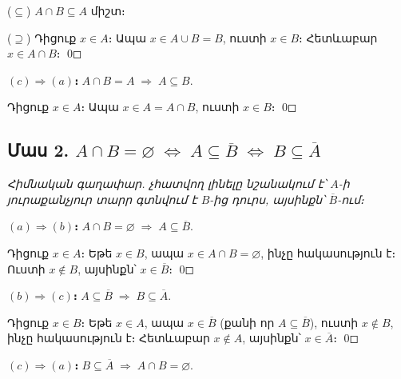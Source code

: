 \documentclass[12pt, a4paper]{article}
\newcommand{\comp}[1]{\overline{#1}}
\begin{document}
($\subseteq$)\; $A \cap B \subseteq A$ միշտ։

($\supseteq$)\; Դիցուք $x \in A$։
Ապա $x \in A \cup B = B$, ուստի $x \in B$։
Հետևաբար $x \in A \cap B$։ \qed

\textbf{$(c) \Rightarrow (a)$։}\;
$A \cap B = A \;\Longrightarrow\; A \subseteq B$.

Դիցուք $x \in A$։ Ապա $x \in A = A \cap B$, ուստի $x \in B$։ \qed

\subsection*{Մաս 2.\; $A \cap B = \varnothing \;\iff\; A \subseteq \comp{B} \;\iff\; B \subseteq \comp{A}$}

\begin{center}
\end{center}

\smallskip
\textit{Հիմնական գաղափար. չհատվող լինելը նշանակում է՝ $A$-ի յուրաքանչյուր տարր գտնվում է $B$-ից դուրս, այսինքն՝ $\comp{B}$-ում։}

\smallskip
\textbf{$(a) \Rightarrow (b)$։}\;
$A \cap B = \varnothing \;\Longrightarrow\; A \subseteq \comp{B}$.

Դիցուք $x \in A$։ Եթե $x \in B$, ապա $x \in A \cap B = \varnothing$, ինչը հակասություն է։
Ուստի $x \notin B$, այսինքն՝ $x \in \comp{B}$։ \qed

\textbf{$(b) \Rightarrow (c)$։}\;
$A \subseteq \comp{B} \;\Longrightarrow\; B \subseteq \comp{A}$.

Դիցուք $x \in B$։ Եթե $x \in A$, ապա $x \in \comp{B}$ (քանի որ $A \subseteq \comp{B}$),
ուստի $x \notin B$, ինչը հակասություն է։ Հետևաբար $x \notin A$, այսինքն՝ $x \in \comp{A}$։ \qed

\textbf{$(c) \Rightarrow (a)$։}\;
$B \subseteq \comp{A} \;\Longrightarrow\; A \cap B = \varnothing$.
\end{document}
